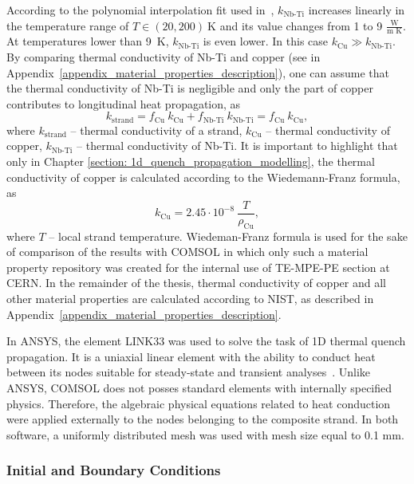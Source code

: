According to the polynomial interpolation fit used in~\cite[p.~46]{material_props_for_heat_transfer_modelling_in_nb3sn_magnets}, $k_\text{Nb-Ti}$ increases linearly in the temperature range of $T \in (20, 200)~\text{K}$ and its value changes from 1 to 9 $\frac{\text{W}}{\text{m K}}$. At temperatures lower than 9~K, $k_\text{Nb-Ti}$ is even lower. In this case $k_\text{Cu} \gg k_\text{Nb-Ti}$. By comparing thermal conductivity of Nb-Ti and copper (see in Appendix~\ref{appendix_material_properties_description}), one can assume that the thermal conductivity of Nb-Ti is negligible and only the part of copper contributes to longitudinal heat propagation, as 
\begin{equation}
    k_\text{strand} = f_\text{Cu} ~ k_\text{Cu} + f_\text{Nb-Ti} ~ k_\text{Nb-Ti} =  f_\text{Cu} ~ k_\text{Cu},
    \label{eqn: k_equiv}
\end{equation}
where $k_\text{strand}$ -- thermal conductivity of a strand, $k_\text{Cu}$ -- thermal conductivity of copper, $k_\text{Nb-Ti}$ -- thermal conductivity of Nb-Ti. It is important to highlight that only in Chapter \ref{section: 1d_quench_propagation_modelling}, the thermal conductivity of copper is calculated according to the Wiedemann-Franz formula, as
\begin{equation}
    k_\text{Cu} = 2.45 \cdot 10^{-8} ~ \frac{T}{\rho_\text{Cu}},
    \label{eqn: k_cu_wiedemann_franz}
\end{equation}
where $T$ -- local strand temperature. Wiedeman-Franz formula is used for the sake of comparison of the results with COMSOL in which only such a material property repository was created for the internal use of TE-MPE-PE section at CERN. In the remainder of the thesis, thermal conductivity of copper and all other material properties are calculated according to NIST, as described in Appendix~\ref{appendix_material_properties_description}. 

In ANSYS, the element LINK33 was used to solve the task of 1D thermal quench propagation. It is a uniaxial linear element with the ability to conduct heat between its nodes suitable for steady-state and transient analyses~\cite{ansys_element_manual}. Unlike ANSYS, COMSOL does not posses standard elements with internally specified physics. Therefore, the algebraic physical equations related to heat conduction were applied externally to the nodes belonging to the composite strand. In both software, a uniformly distributed mesh was used with mesh size equal to 0.1 mm.

\subsubsection{Initial and Boundary Conditions}

